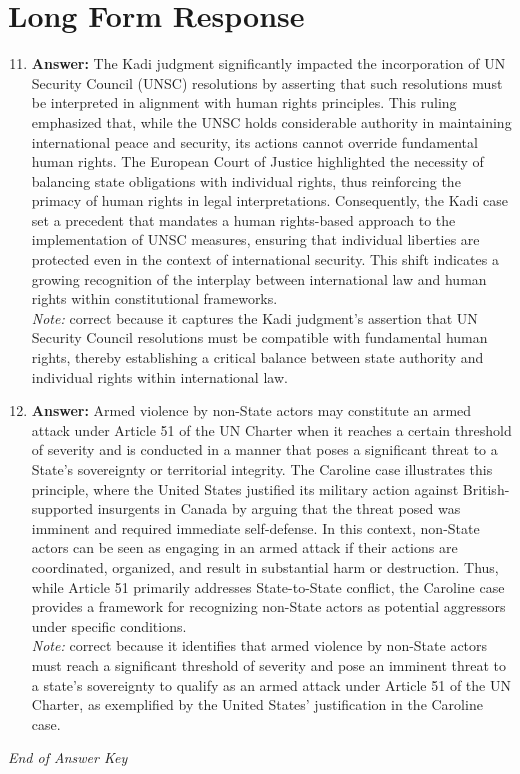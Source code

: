 \documentclass[12pt]{article}
\begin{document}
\section*{Long Form Response}
\begin{enumerate}[label=\arabic*.]
\setcounter{enumi}{10}
\item \textbf{Answer:} The Kadi judgment significantly impacted the incorporation of UN Security Council (UNSC) resolutions by asserting that such resolutions must be interpreted in alignment with human rights principles. This ruling emphasized that, while the UNSC holds considerable authority in maintaining international peace and security, its actions cannot override fundamental human rights. The European Court of Justice highlighted the necessity of balancing state obligations with individual rights, thus reinforcing the primacy of human rights in legal interpretations. Consequently, the Kadi case set a precedent that mandates a human rights-based approach to the implementation of UNSC measures, ensuring that individual liberties are protected even in the context of international security. This shift indicates a growing recognition of the interplay between international law and human rights within constitutional frameworks.
\\ \textit{Note:} correct because it captures the Kadi judgment's assertion that UN Security Council resolutions must be compatible with fundamental human rights, thereby establishing a critical balance between state authority and individual rights within international law.
\item \textbf{Answer:} Armed violence by non-State actors may constitute an armed attack under Article 51 of the UN Charter when it reaches a certain threshold of severity and is conducted in a manner that poses a significant threat to a State's sovereignty or territorial integrity. The Caroline case illustrates this principle, where the United States justified its military action against British-supported insurgents in Canada by arguing that the threat posed was imminent and required immediate self-defense. In this context, non-State actors can be seen as engaging in an armed attack if their actions are coordinated, organized, and result in substantial harm or destruction. Thus, while Article 51 primarily addresses State-to-State conflict, the Caroline case provides a framework for recognizing non-State actors as potential aggressors under specific conditions.
\\ \textit{Note:} correct because it identifies that armed violence by non-State actors must reach a significant threshold of severity and pose an imminent threat to a state's sovereignty to qualify as an armed attack under Article 51 of the UN Charter, as exemplified by the United States' justification in the Caroline case.
\end{enumerate}

\vfill
\noindent\textit{End of Answer Key}
\end{document}
